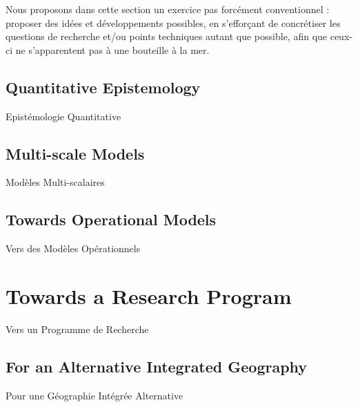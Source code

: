Nous proposons dans cette section un exercice pas forcément conventionnel : proposer des idées et développements possibles, en s'efforçant de concrétiser les questions de recherche et/ou points techniques autant que possible, afin que ceux-ci ne s'apparentent pas à une bouteille à la mer.



\subsection{Quantitative Epistemology}{Epistémologie Quantitative}

%



\subsection{Multi-scale Models}{Modèles Multi-scalaires}





\subsection{Towards Operational Models}{Vers des Modèles Opérationnels}






\newpage


\section{Towards a Research Program}{Vers un Programme de Recherche}


\subsection{For an Alternative Integrated Geography}{Pour une Géographie Intégrée Alternative}



